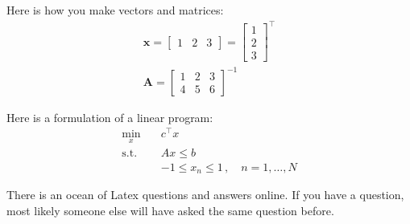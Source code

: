 \documentclass{article}
\begin{document}
Here is how you make vectors and matrices:
\begin{align}
    \mathbf x = \begin{bmatrix} 1 & 2 & 3 \end{bmatrix} = \begin{bmatrix} 1 \\ 2 \\ 3 \end{bmatrix}^\top \\
    \mathbf A = \begin{bmatrix} 1 & 2 & 3 \\ 4 & 5 & 6 \end{bmatrix}^{-1}
\end{align}

Here is a formulation of a linear program:
\begin{align*}
    \min_{x} \quad & c^\top x \\
    \mathrm{s.t.} \quad 
    & A x \leq b \\
    &-1 \leq x_n \leq 1 \,, \quad n = 1, \dots, N
\end{align*}

There is an ocean of Latex questions and answers online. If you have a question, most likely someone else will have asked the same question before. 
\end{document}
